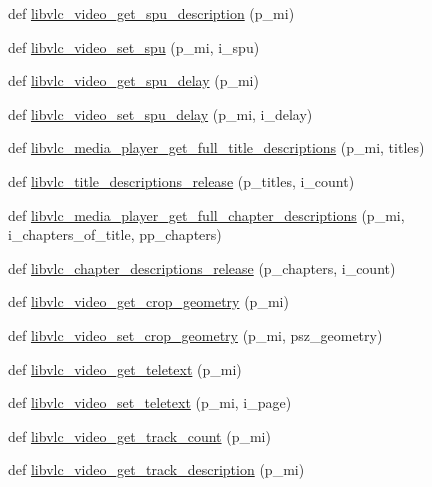 \begin{DoxyCompactItemize}
def \hyperlink{namespacevlc_a4dee99f1b8023bb53f698403c94b2573}{libvlc\+\_\+video\+\_\+get\+\_\+spu\+\_\+description} (p\+\_\+mi)
\item 
def \hyperlink{namespacevlc_a429c12d1cb5157663d43472108bd1eeb}{libvlc\+\_\+video\+\_\+set\+\_\+spu} (p\+\_\+mi, i\+\_\+spu)
\item 
def \hyperlink{namespacevlc_a1ea9c1d1ba99cac0cd71cb670c54d6f2}{libvlc\+\_\+video\+\_\+get\+\_\+spu\+\_\+delay} (p\+\_\+mi)
\item 
def \hyperlink{namespacevlc_aef6c3b516812532dbf6a1b52e3e0a9db}{libvlc\+\_\+video\+\_\+set\+\_\+spu\+\_\+delay} (p\+\_\+mi, i\+\_\+delay)
\item 
def \hyperlink{namespacevlc_a61a2bcf2cf564f255a1087a54d5df1b6}{libvlc\+\_\+media\+\_\+player\+\_\+get\+\_\+full\+\_\+title\+\_\+descriptions} (p\+\_\+mi, titles)
\item 
def \hyperlink{namespacevlc_a39ff76a9d36a5266dfcb66c078455da8}{libvlc\+\_\+title\+\_\+descriptions\+\_\+release} (p\+\_\+titles, i\+\_\+count)
\item 
def \hyperlink{namespacevlc_adf5d3e952881c8a2d36db4a98bfda4a2}{libvlc\+\_\+media\+\_\+player\+\_\+get\+\_\+full\+\_\+chapter\+\_\+descriptions} (p\+\_\+mi, i\+\_\+chapters\+\_\+of\+\_\+title, pp\+\_\+chapters)
\item 
def \hyperlink{namespacevlc_a57028e9c3f2b8ddc8722423bb560e2f7}{libvlc\+\_\+chapter\+\_\+descriptions\+\_\+release} (p\+\_\+chapters, i\+\_\+count)
\item 
def \hyperlink{namespacevlc_a90ce254d86107126899a45083478af1c}{libvlc\+\_\+video\+\_\+get\+\_\+crop\+\_\+geometry} (p\+\_\+mi)
\item 
def \hyperlink{namespacevlc_abdfc647c45f0b22d8aa3ad8f87b9bd12}{libvlc\+\_\+video\+\_\+set\+\_\+crop\+\_\+geometry} (p\+\_\+mi, psz\+\_\+geometry)
\item 
def \hyperlink{namespacevlc_a5109017fbef0af0ea955b6aad723b1e3}{libvlc\+\_\+video\+\_\+get\+\_\+teletext} (p\+\_\+mi)
\item 
def \hyperlink{namespacevlc_af977323ec20485a5a0ea9b824eca479f}{libvlc\+\_\+video\+\_\+set\+\_\+teletext} (p\+\_\+mi, i\+\_\+page)
\item 
def \hyperlink{namespacevlc_a87f53e3e2f2f5b5a0c24aaa72e6575b0}{libvlc\+\_\+video\+\_\+get\+\_\+track\+\_\+count} (p\+\_\+mi)
\item 
def \hyperlink{namespacevlc_a68edc909fdc25c8f1fc60031778445af}{libvlc\+\_\+video\+\_\+get\+\_\+track\+\_\+description} (p\+\_\+mi)
\item 

\end{DoxyCompactItemize}
